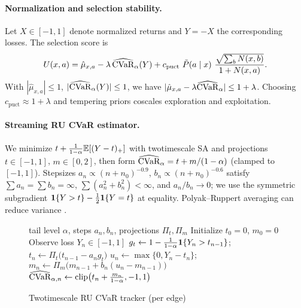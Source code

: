 \paragraph{Normalization and selection stability.}
Let $X\in[-1,1]$ denote normalized returns and $Y=-X$ the corresponding losses. The selection score is
\[
U(x,a)=\hat\mu_{x,a}-\lambda\,\widehat{\CVaR}_\alpha(Y)+c_{\text{puct}}\ \tilde P(a\mid x)\ \frac{\sqrt{\sum_b N(x,b)}}{1+N(x,a)}.
\]
With $|\hat\mu_{x,a}|\le 1$, $|\widehat{\mathrm{CVaR}}_\alpha(Y)|\le 1$, we have $|\hat\mu_{x,a}-\lambda \widehat{\mathrm{CVaR}}_\alpha|\le 1+\lambda$. Choosing $c_{\text{puct}}\approx 1+\lambda$ and tempering priors co\textendash scales exploration and exploitation.

\paragraph{Streaming RU CVaR estimator.}
We minimize $t+\frac{1}{1-\alpha}\mathbb{E}[(Y-t)_+]$ with two\textendash timescale SA and projections $t\in[-1,1]$, $m\in[0,2]$, then form $\widehat{\mathrm{CVaR}}_\alpha=t+m/(1-\alpha)$ (clamped to $[-1,1]$). Stepsizes $a_n\propto (n+n_0)^{-0.9}$, $b_n\propto (n+n_0)^{-0.6}$ satisfy $\sum a_n=\sum b_n=\infty$, $\sum (a_n^2+b_n^2)<\infty$, and $a_n/b_n\to 0$; we use the symmetric subgradient $\mathbf{1}\{Y>t\}-\tfrac{1}{2}\mathbf{1}\{Y=t\}$ at equality. Polyak–Ruppert averaging can reduce variance \cite{polyak1992averaging}.

\begin{figure}[t]
\centering
\begin{adjustbox}{width=\linewidth}
\begin{minipage}{\linewidth}
\begin{algorithm}[H]
\caption{Two\textendash timescale RU CVaR tracker (per edge)}
\label{alg:cvar}
\begin{algorithmic}[1]
\Require tail level $\alpha$, steps $a_n,b_n$, projections $\Pi_t,\Pi_m$
\State Initialize $t_0=0$, $m_0=0$
  \State Observe loss $Y_n\in[-1,1]$
  \State $g_t \gets 1-\frac{1}{1-\alpha}\mathbf{1}\{Y_n>t_{n-1}\}$; $t_n\gets \Pi_t\big(t_{n-1}-a_n g_t\big)$
  \State $u_n\gets \max\{0,Y_n-t_n\}$; $m_n\gets \Pi_m\big(m_{n-1}+b_n(u_n-m_{n-1})\big)$
  \State $\widehat{\mathrm{CVaR}}_{\alpha,n}\gets \mathrm{clip}\big(t_n+\frac{m_n}{1-\alpha},-1,1\big)$
\EndFor
\end{algorithmic}
\end{algorithm}
\end{minipage}
\end{adjustbox}
\end{figure}

